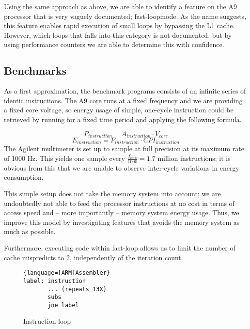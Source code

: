 Using the same approach as above, we are able to identify a feature on the A9
processor that is very vaguely documented; fast-loop\texttrademark mode. As the
name suggests, this feature enables rapid execution of small loops by bypassing
the L1 cache.  However, which loops that falls into this category is not
documented, but by using performance counters we are able to determine this with
confidence.  


\subsection{Benchmarks}
As a first approximation, the benchmark programs consists of an infinite series
of identic instructions. The A9 core runs at a fixed frequency and we are
providing a fixed core voltage, so energy usage of simple, one-cycle instruction
could be retrieved by running for a fixed time period and applying the following
formula.

\begin{equation}
    P_{instruction} = A_{instruction} \cdot V_{core}
\end{equation}
\begin{equation}
    E_{instruction} = P_{instruction} \cdot CPI_{instruction}
\end{equation}
The Agilent multimeter is set up to sample at full precision at its maximum rate
of 1000 Hz. This yields one sample every $\frac{ f_{core} }{ 1000 } = 1.7$
million instructions; it is obvious from this that we are unable to observe
inter-cycle variations in energy consumption.  

This simple setup does not take the memory system into account; we are
undoubtedly not able to feed the processor instructions at no cost in terms of
access speed and -- more importantly -- memory system energy usage. Thus, we
improve this model by investigating features that avoids the memory system as
much as possible.

Furthermore, executing code within fast-loop allows us to limit the number of
cache mispredicts to 2, independently of the iteration count.

\begin{figure}
    \begin{lstlisting}{language=[ARM]Assembler}
label: instruction
       ... (repeats 13X)
       subs
       jne label
    \end{lstlisting}
    \caption{Instruction loop}
    \label{list:inst_loop}
\end{figure}

